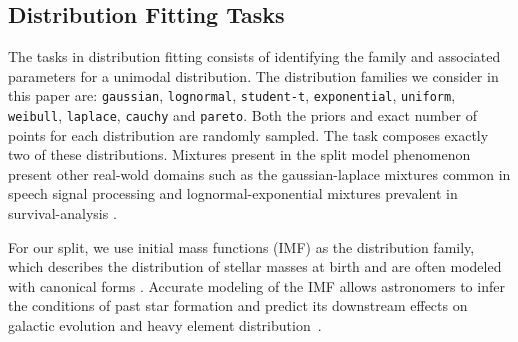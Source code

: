 \documentclass{article}
\newcommand\gd[1]{\todo[color=red!40]{{\bf Greg}: #1}}
\newcommand{\splitlabel}[3]{%
  \tikz[baseline=-0.6ex]{%
    \node[
      rounded corners=3pt,
      fill=#2,
      draw=#1,
      line width=0.8pt,
      inner xsep=4pt,
      inner ysep=2pt,
      font=\bfseries\small
    ] {#3};%
  }%
}
\newcommand{\Easy}{\splitlabel{easygreen}{easyfill}{Easy}}
\newcommand{\Hard}{\splitlabel{hardred}{hardfill}{Hard}}
\newcommand{\Astro}{\splitlabel{astroblue}{astrofill}{Astro}}
\begin{document}
\subsection{Distribution Fitting Tasks}
\vspace{-0.3em}
The \protect\Easy{} tasks in distribution fitting consists of identifying the family and associated parameters for a unimodal distribution. The distribution families we consider in this paper are: {\small{\tt gaussian}}, {\small{\tt lognormal}}, {\small{\tt student-t}}, {\small{\tt exponential}}, {\small{\tt uniform}}, {\small{\tt weibull}}, {\small{\tt laplace}}, {\small{\tt cauchy}} and {\small{\tt pareto}}. Both the priors and exact number of points for each distribution are randomly sampled. The \protect\Hard{} task composes exactly two of these distributions. Mixtures present in the \protect\Hard{} split model phenomenon present other real-wold domains such as the gaussian-laplace mixtures common in speech signal processing \cite{speech_signal} and lognormal-exponential mixtures prevalent in survival-analysis \cite{maller2024mixture}.

For our \protect\Astro{} split, we use initial mass functions (IMF) as the distribution family, which describes the distribution of stellar masses at birth
and are often modeled with canonical forms \cite{imf_survey}. 
Accurate modeling of the IMF allows astronomers to infer the conditions of past star formation and predict its downstream effects on galactic evolution and heavy element distribution~\citep{annurev-astro-082708-101642}.
\end{document}
